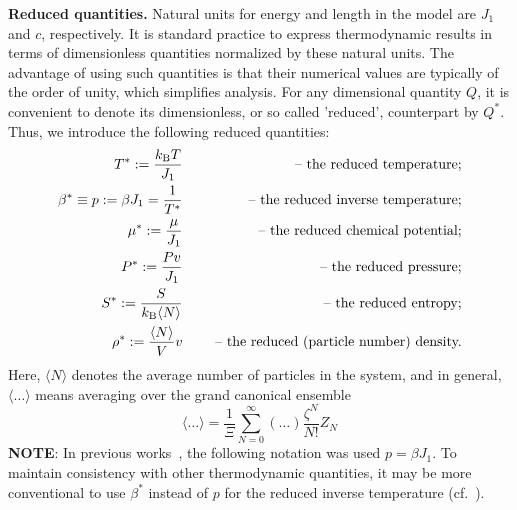\documentclass[12pt]{article}
\numberwithin{equation}{section}
\begin{document}
	\textbf{Reduced quantities.} Natural units for energy and length in the model are $J_1$ and $c$, respectively. It is standard practice to express thermodynamic results in terms of dimensionless quantities normalized by these natural units. The advantage of using such quantities is that their numerical values are typically of the order of unity, which simplifies analysis. 	For any dimensional quantity $Q$, it is convenient to denote its dimensionless, or so called 'reduced', counterpart by $Q^*$. Thus, we introduce the following reduced quantities:
	\begin{eqnarray}
		\label{def:reduced}
		T^* := \frac{k_{\rm B} T}{J_1} & \quad & \text{ -- the reduced temperature;} 
		\nonumber\\
		\beta^* \equiv p := \beta J_1 = \frac{1}{T^*} & \quad & \text{ -- the reduced inverse temperature;}
		\nonumber\\
		\mu^* := \frac{\mu}{J_1} & \quad & \text{ -- the reduced chemical potential;}
		\nonumber\\ 
		P^* := \frac{Pv}{J_1} & & \text{ -- the reduced pressure;}
		\nonumber\\
		S^* := \frac{S}{k_{\rm B} \langle N \rangle} & & \text{ -- the reduced entropy;}
		\nonumber\\
		\rho^* := \frac{\langle N \rangle}{V} v && \text{ -- the reduced (particle number) density.}
	\end{eqnarray}
	Here, $\langle N \rangle$ denotes the average number of particles in the system, and in general, $\langle \ldots \rangle$ means averaging over the grand canonical ensemble
	\begin{equation}
		\langle \ldots \rangle = \frac{1}{\Xi} \sum_{N=0}^{\infty}(\ldots)\frac{\zeta^N}{N!}Z_N
	\end{equation}
	\textbf{NOTE}: In previous works~\cite{KKD18,KKD20,KD22}, the following notation was used $p=\beta J_1$. To maintain consistency with other thermodynamic quantities, it may be more conventional to use $\beta^*$ instead of $p$ for the reduced inverse temperature (cf.~\cite{RDGMR13}).
	
\end{document}
